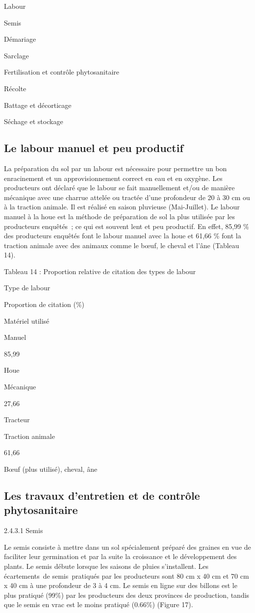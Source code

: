 \documentclass[12pt,oneside]{report}
\begin{document}
Labour

Semis

Démariage

Sarclage

Fertilisation et contrôle phytosanitaire

Récolte

Battage et décorticage

Séchage et stockage

\subsection{Le labour manuel et peu productif}
La préparation du sol par un labour est nécessaire pour permettre un bon enracinement et un approvisionnement correct en eau et en oxygène. Les producteurs ont déclaré que le labour se fait manuellement et/ou de manière mécanique avec une charrue attelée ou tractée d’une profondeur de 20 à 30 cm ou à la traction animale. Il est réalisé en saison pluvieuse (Mai-Juillet). Le labour manuel à la houe est la méthode de préparation de sol la plus utilisée par les producteurs enquêtés ; ce qui est souvent lent et peu productif. En effet, 85,99 \% des producteurs enquêtés font le labour manuel avec la houe et 61,66 \% font la traction animale avec des animaux comme le bœuf, le cheval et l’âne (Tableau 14).

Tableau 14 : Proportion relative de citation des types de labour

Type de labour

Proportion de citation (\%)

Matériel utilisé

Manuel

85,99

Houe

Mécanique

27,66

Tracteur

Traction animale

61,66

Bœuf (plus utilisé), cheval, âne

\subsection{Les travaux d’entretien et de contrôle phytosanitaire}
2.4.3.1 Semis

Le semis consiste à mettre dans un sol spécialement préparé des graines en vue de faciliter leur germination et par la suite la croissance et le développement des plants. Le semis débute lorsque les saisons de pluies s’installent. Les écartements de semis pratiqués par les producteurs sont 80 cm x 40 cm et 70 cm x 40 cm à une profondeur de 3 à 4 cm. Le semis en ligne sur des billons est le plus pratiqué (99\%) par les producteurs des deux provinces de production, tandis que le semis en vrac est le moins pratiqué (0.66\%) (Figure 17).
\end{document}
